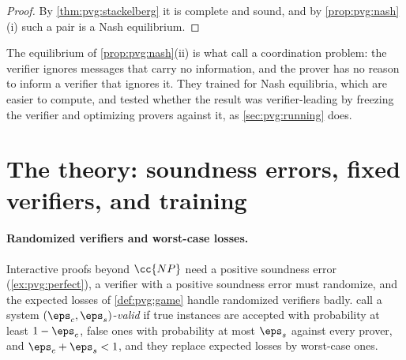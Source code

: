 \begin{refsection}

\begin{proof}
By \cref{thm:pvg:stackelberg} it is complete and sound, and by \cref{prop:pvg:nash}(i) such a pair is a Nash equilibrium.
\end{proof}

The equilibrium of \cref{prop:pvg:nash}(ii) is what \textcite{AnilEtAl2021} call a coordination problem: the verifier ignores messages that carry no information, and the prover has no reason to inform a verifier that ignores it. They trained for Nash equilibria, which are easier to compute, and tested whether the result was verifier-leading by freezing the verifier and optimizing provers against it, as \cref{sec:pvg:running} does.

\section{The theory: soundness errors, fixed verifiers, and training}\label{sec:pvg:beyond}

\paragraph{Randomized verifiers and worst-case losses.} Interactive proofs beyond $\cc{NP}$ need a positive soundness error (\cref{ex:pvg:perfect}), a verifier with a positive soundness error must randomize, and the expected losses of \cref{def:pvg:game} handle randomized verifiers badly. \Textcite{HammondAdamDay2025} call a system $(\eps_c,\eps_s)$-\emph{valid} if true instances are accepted with probability at least $1-\eps_c$, false ones with probability at most $\eps_s$ against every prover, and $\eps_c+\eps_s<1$, and they replace expected losses by worst-case ones.


\end{refsection}
